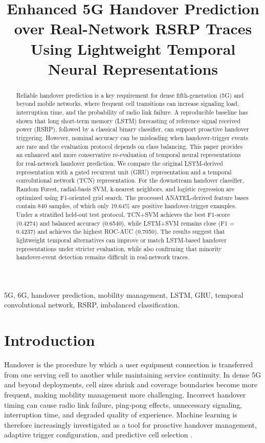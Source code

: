 \documentclass[conference]{IEEEtran}
\title{Enhanced 5G Handover Prediction over Real-Network RSRP Traces Using Lightweight Temporal Neural Representations}
\author{\IEEEauthorblockN{Mohammadali Mousavireineh and Astra Mousavireineh}
\IEEEauthorblockA{Independent Researchers\\
Corresponding author: mousavireineh@gmail.com}}
\begin{document}
\maketitle
\begin{abstract}
Reliable handover prediction is a key requirement for dense fifth-generation (5G) and beyond mobile networks, where frequent cell transitions can increase signaling load, interruption time, and the probability of radio link failure. A reproducible baseline has shown that long short-term memory (LSTM) forecasting of reference signal received power (RSRP), followed by a classical binary classifier, can support proactive handover triggering. However, nominal accuracy can be misleading when handover-trigger events are rare and the evaluation protocol depends on class balancing. This paper provides an enhanced and more conservative re-evaluation of temporal neural representations for real-network handover prediction. We compare the original LSTM-derived representation with a gated recurrent unit (GRU) representation and a temporal convolutional network (TCN) representation. For the downstream handover classifier, Random Forest, radial-basis SVM, k-nearest neighbors, and logistic regression are optimized using F1-oriented grid search. The processed ANATEL-derived feature bases contain 840 samples, of which only 19.64\% are positive handover-trigger examples. Under a stratified held-out test protocol, TCN+SVM achieves the best F1-score (0.4274) and balanced accuracy (0.6540), while LSTM+SVM remains close (F1 = 0.4237) and achieves the highest ROC-AUC (0.7050). The results suggest that lightweight temporal alternatives can improve or match LSTM-based handover representations under stricter evaluation, while also confirming that minority handover-event detection remains difficult in real-network traces.
\end{abstract}
\begin{IEEEkeywords}
5G, 6G, handover prediction, mobility management, LSTM, GRU, temporal convolutional network, RSRP, imbalanced classification.
\end{IEEEkeywords}

\section{Introduction}
Handover is the procedure by which a user equipment connection is transferred from one serving cell to another while maintaining service continuity. In dense 5G and beyond deployments, cell sizes shrink and coverage boundaries become more frequent, making mobility management more challenging. Incorrect handover timing can cause radio link failure, ping-pong effects, unnecessary signaling, interruption time, and degraded quality of experience. Machine learning is therefore increasingly investigated as a tool for proactive handover management, adaptive trigger configuration, and predictive cell selection \cite{mollel2021, thillaigovindhan2024}.
\end{document}
